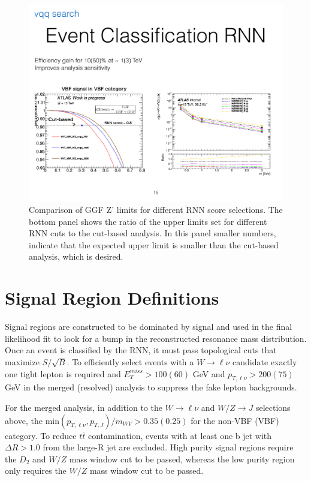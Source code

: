 \begin{figure}[h!]
  \centering
  \includegraphics[width=\hsize]{figures/Analysis/rnn_limits.pdf}
  \caption{Comparison of GGF Z' limits for different RNN score selections. The bottom panel shows the ratio of the upper limits set for different RNN cuts to the cut-based analysis. In this panel smaller numbers, indicate that the expected upper limit is smaller than the cut-based analysis, which is desired.} 
  \label{fig:rnn_limits}
\end{figure}
\FloatBarrier

\section{Signal Region Definitions}
\label{Signal Region Definitions}
Signal regions are constructed to be dominated by signal and used in the final likelihood fit to look for a bump in the reconstructed resonance mass distribution. Once an event is classified by the RNN, it must pass topological cuts that maximize $S/\sqrt{B}$. To efficiently select events with a $W\rightarrow \ell \nu$ candidate exactly one tight lepton is required and $E_{T}^{miss} > 100(60)$ GeV and $p_{T,\ell\nu} > 200(75)$ GeV in the merged (resolved) analysis to suppress the fake lepton backgrounds. 

For the merged analysis, in addition to the $W \rightarrow \ell \nu$ and $W/Z \rightarrow J$ selections above, the min$(p_{T, \ell \nu}, p_{T,J})/m_{WV} > 0.35(0.25)$ for the non-VBF (VBF) category. To reduce $t\bar{t}$ contamination, events with at least one b jet with $\Delta R > 1.0$ from the large-R jet are excluded. High purity signal regions require the $D_{2}$ and $W/Z$ mass window cut to be passed, whereas the low purity region only requires the  $W/Z$ mass window cut to be passed. 

